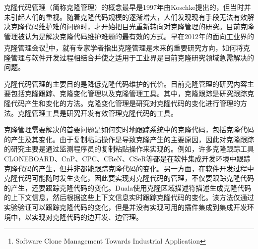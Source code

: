 克隆代码管理（简称克隆管理）的概念最早是1997年由Koschke提出的\cite{koschke2008frontiers}，但当时并未引起人们的重视。随着克隆代码规模的逐渐增大，人们发现现有手段无法有效解决克隆代码维护难的问题时，才开始把目光重新转向对克隆管理的研究。目前克隆管理被认为是解决克隆代码维护难题的最有效的方式。早在2012年的面向工业界的克隆管理会议\footnote{Software Clone Management Towards Industrial Application}中，就有专家学者指出克隆管理是未来的重要研究方向，如何将克隆管理与软件开发过程相结合并使之适用于工业界是目前克隆研究领域急需解决的问题\cite{koschke2012software}。%



克隆代码管理的主要目的是降低克隆代码维护的代价。目前克隆管理的研究内容主要包括克隆跟踪、克隆变化管理以及克隆管理工具。其中，克隆跟踪是研究跟踪克隆代码产生和变化的方法。克隆变化管理是研究对克隆代码的变化进行管理的方法。克隆管理工具是研究开发有效管理克隆代码的工具。

克隆管理需要解决的首要问题是如何实时地跟踪系统中的克隆代码，包括克隆代码的产生及其变化。由于复制粘贴操作是导致克隆产生的主要原因，因此对克隆跟踪的研究主要是通过监测程序员的复制粘贴操作来实现的。例如，许多克隆跟踪工具CLONEBOARD\cite{de2009managing}、CnP\cite{hou2009cnp}、CPC\cite{weckerle2008cpc}、CReN\cite{jablonski2007cren}、CSeR\cite{jacob2010actively}等都是在软件集成开发环境中跟踪克隆代码的产生，但并非都能跟踪克隆代码的变化。另一方面，在软件开发过程中克隆代码可能随时发生变化，因此要实现对克隆代码的管理，不仅要跟踪克隆代码的产生，还要跟踪克隆代码的变化。Duala使用克隆区域描述符描述生成克隆代码的上下文信息，然后根据这些上下文信息实时跟踪克隆代码的变化\cite{duala2008clonetracker}\cite{duala2010clone}。该方法仅通过实验验证可以跟踪克隆代码的变化，但是并没有实现可用的插件集成到集成开发环境中，以实现对克隆代码的边开发、边管理。

